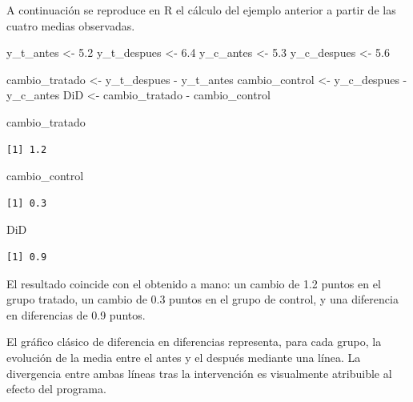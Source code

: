 \documentclass[
  spanish,
  a4paper,
]{scrreport}
\newenvironment{Shaded}{\begin{snugshade}}{\end{snugshade}}
\newcommand{\FloatTok}[1]{\textcolor[rgb]{0.68,0.00,0.00}{#1}}
\newcommand{\NormalTok}[1]{\textcolor[rgb]{0.00,0.23,0.31}{#1}}
\newcommand{\OtherTok}[1]{\textcolor[rgb]{0.00,0.23,0.31}{#1}}
\newcommand{\SpecialCharTok}[1]{\textcolor[rgb]{0.37,0.37,0.37}{#1}}
\theoremstyle{definition}
\theoremstyle{definition}
\theoremstyle{remark}
\begin{document}
A continuación se reproduce en R el cálculo del ejemplo anterior a
partir de las cuatro medias observadas.

\begin{Shaded}
\begin{Highlighting}[]
\NormalTok{y\_t\_antes }\OtherTok{\textless{}{-}} \FloatTok{5.2}
\NormalTok{y\_t\_despues }\OtherTok{\textless{}{-}} \FloatTok{6.4}
\NormalTok{y\_c\_antes }\OtherTok{\textless{}{-}} \FloatTok{5.3}
\NormalTok{y\_c\_despues }\OtherTok{\textless{}{-}} \FloatTok{5.6}

\NormalTok{cambio\_tratado }\OtherTok{\textless{}{-}}\NormalTok{ y\_t\_despues }\SpecialCharTok{{-}}\NormalTok{ y\_t\_antes}
\NormalTok{cambio\_control }\OtherTok{\textless{}{-}}\NormalTok{ y\_c\_despues }\SpecialCharTok{{-}}\NormalTok{ y\_c\_antes}
\NormalTok{DiD }\OtherTok{\textless{}{-}}\NormalTok{ cambio\_tratado }\SpecialCharTok{{-}}\NormalTok{ cambio\_control}

\NormalTok{cambio\_tratado}
\end{Highlighting}
\end{Shaded}

\begin{verbatim}
[1] 1.2
\end{verbatim}

\begin{Shaded}
\begin{Highlighting}[]
\NormalTok{cambio\_control}
\end{Highlighting}
\end{Shaded}

\begin{verbatim}
[1] 0.3
\end{verbatim}

\begin{Shaded}
\begin{Highlighting}[]
\NormalTok{DiD}
\end{Highlighting}
\end{Shaded}

\begin{verbatim}
[1] 0.9
\end{verbatim}

El resultado coincide con el obtenido a mano: un cambio de 1.2 puntos en
el grupo tratado, un cambio de 0.3 puntos en el grupo de control, y una
diferencia en diferencias de 0.9 puntos.

El gráfico clásico de diferencia en diferencias representa, para cada
grupo, la evolución de la media entre el antes y el después mediante una
línea. La divergencia entre ambas líneas tras la intervención es
visualmente atribuible al efecto del programa.
\end{document}
